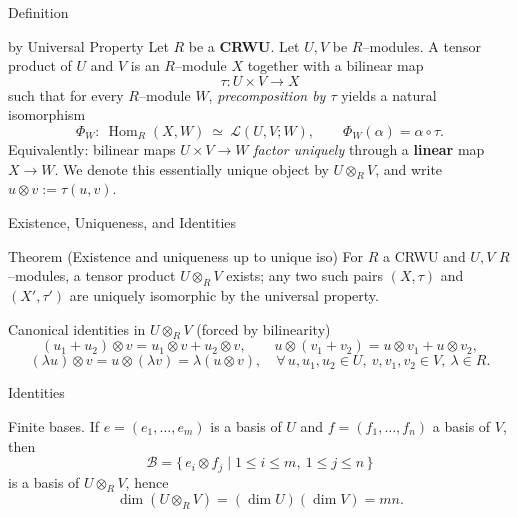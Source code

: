 
\date{22 October 2025}



\begin{frame}
  \cmctitleframe
\end{frame}

\begin{frame}{Definition}
\begin{block}{by Universal Property}
  Let $R$ be a \textbf{CRWU}. Let $U,V$ be $R$–modules.
A tensor product of $U$ and $V$ is an $R$–module $X$ together with a bilinear map
\[
\tau:U\times V\longrightarrow X
\]
such that for every $R$–module $W$, \emph{precomposition by $\tau$} yields a natural isomorphism
\[
\Phi_W:\ \operatorname{Hom}_R(X,W)\ \simeq\ \mathcal{L}(U,V;W),\qquad
\Phi_W(\alpha)=\alpha\circ \tau.
\]
Equivalently: bilinear maps $U\times V\to W$ \emph{factor uniquely} through a \textbf{linear} map $X\to W$.
We denote this essentially unique object by $U\otimes_R V$, and write $u\otimes v:=\tau(u,v)$.
\end{block}
\end{frame}

\begin{frame}{Existence, Uniqueness, and Identities}
\begin{block}{Theorem (Existence and uniqueness up to unique iso)}
For $R$ a CRWU and $U,V$ $R$–modules, a tensor product $U\otimes_R V$ exists; any two such pairs $(X,\tau)$ and $(X',\tau')$ are uniquely isomorphic by the universal property.
\end{block}

\begin{block}{Canonical identities in $U\otimes_R V$ (forced by bilinearity)}
\[
(u_1+u_2)\otimes v = u_1\otimes v + u_2\otimes v,\qquad
u\otimes (v_1+v_2) = u\otimes v_1 + u\otimes v_2,
\]
\[
(\lambda u)\otimes v = u\otimes (\lambda v) = \lambda (u\otimes v),\quad
\forall\, u,u_1,u_2\in U,\ v,v_1,v_2\in V,\ \lambda\in R.
\]
\end{block}
\end{frame}

\begin{frame}{Identities}
\begin{block}{Finite bases.} If $e=(e_1,\dots,e_m)$ is a basis of $U$ and $f=(f_1,\dots,f_n)$ a basis of $V$, then
\[
\mathcal{B}=\{\,e_i\otimes f_j \mid 1\le i\le m,\ 1\le j\le n\,\}
\]
is a basis of $U\otimes_R V$, hence
\[
\dim(U\otimes_R V)= (\dim U)(\dim V)=mn.
\]
\end{block}
\end{frame}

